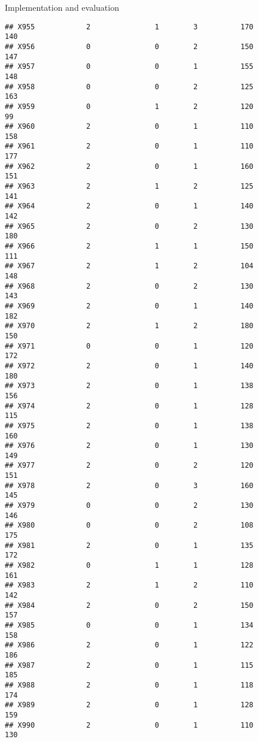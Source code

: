 \documentclass[
  ignorenonframetext,
]{beamer}
\begin{document}
\begin{frame}[fragile]{Implementation and evaluation}
\begin{verbatim}
## X955            2               1        3          170            140
## X956            0               0        2          150            147
## X957            0               0        1          155            148
## X958            0               0        2          125            163
## X959            0               1        2          120             99
## X960            2               0        1          110            158
## X961            2               0        1          110            177
## X962            2               0        1          160            151
## X963            2               1        2          125            141
## X964            2               0        1          140            142
## X965            2               0        2          130            180
## X966            2               1        1          150            111
## X967            2               1        2          104            148
## X968            2               0        2          130            143
## X969            2               0        1          140            182
## X970            2               1        2          180            150
## X971            0               0        1          120            172
## X972            2               0        1          140            180
## X973            2               0        1          138            156
## X974            2               0        1          128            115
## X975            2               0        1          138            160
## X976            2               0        1          130            149
## X977            2               0        2          120            151
## X978            2               0        3          160            145
## X979            0               0        2          130            146
## X980            0               0        2          108            175
## X981            2               0        1          135            172
## X982            0               1        1          128            161
## X983            2               1        2          110            142
## X984            2               0        2          150            157
## X985            0               0        1          134            158
## X986            2               0        1          122            186
## X987            2               0        1          115            185
## X988            2               0        1          118            174
## X989            2               0        1          128            159
## X990            2               0        1          110            130

\end{verbatim}
\end{frame}
\end{document}
